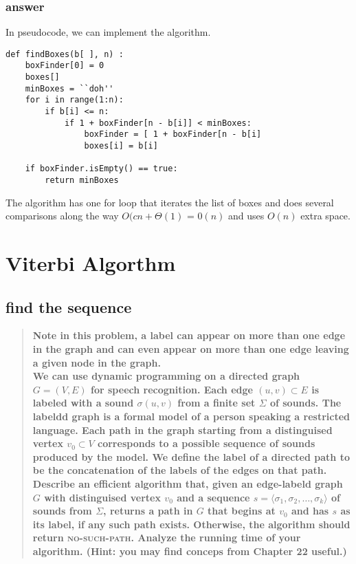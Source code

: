 \documentclass[titlepage]{article}\usepackage[]{graphicx}\usepackage[]{color}
\begin{document}
\subsubsection{answer}
In pseudocode, we can implement the algorithm. 

\begin{lstlisting}
def findBoxes(b[ ], n) :
	boxFinder[0] = 0 
	boxes[]
	minBoxes = ``doh''
	for i in range(1:n):
		if b[i] <= n:
			if 1 + boxFinder[n - b[i]] < minBoxes:
				boxFinder = [ 1 + boxFinder[n - b[i]
				boxes[i] = b[i]

	if boxFinder.isEmpty() == true: 
		return minBoxes

\end{lstlisting}
The algorithm has one for loop that iterates the list of boxes and does several
comparisons along the way $O(cn + \Theta(1)$ = $0(n)$ and uses $O(n)$ extra
space. 



\section{Viterbi Algorthm}
	\subsection{find the sequence}
\begin{quote}
	\textbf{Note in this problem, a label can appear on more than one edge in the graph
		and can even appear on more than one edge leaving a given node in the graph.
		\\
		We can use dynamic programming on a directed graph $G = (V,E)$ for speech
		recognition. Each edge $(u,v) \subset E$ is labeled with a sound
		$\sigma(u,v)$ from a finite set $\Sigma$ of sounds. The labeldd graph is a
		formal model of a person speaking a restricted language. Each path in the graph
		starting from a distinguised vertex $v_0 \subset V$ corresponds to a possible
		sequence of sounds produced by the model. We define the label of a directed
		path to be the concatenation of the labels of the edges on that path. 
		Describe an efficient algorithm that, given an edge-labeld graph
		$G$ with distinguised vertex $v_0$ and a sequence $s = \langle \sigma_1,
		\sigma_2, \dots, \sigma_k \rangle$ of sounds from $\Sigma$, returns a path in
		$G$ that begins at $v_0$ and has $s$ as its label, if any such path exists.
		Otherwise, the algorithm should return \textsc{no-such-path}. Analyze the
		running time of your algorithm. (Hint: you may find conceps from Chapter 22
	useful.)}
\end{quote}
\end{document}
